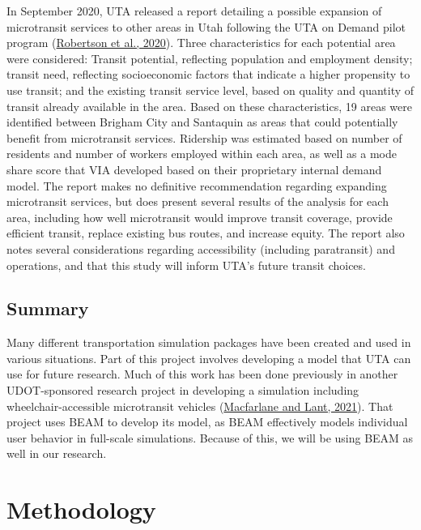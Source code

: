 \documentclass[
]{report}
\begin{document}
In September 2020, UTA released a report detailing a possible expansion of microtransit services to other areas in Utah following the UTA on Demand pilot program (\protect\hyperlink{ref-UTAreport}{Robertson et al., 2020}). Three characteristics for each potential area were considered: Transit potential, reflecting population and employment density; transit need, reflecting socioeconomic factors that indicate a higher propensity to use transit; and the existing transit service level, based on quality and quantity of transit already available in the area. Based on these characteristics, 19 areas were identified between Brigham City and Santaquin as areas that could potentially benefit from microtransit services. Ridership was estimated based on number of residents and number of workers employed within each area, as well as a mode share score that VIA developed based on their proprietary internal demand model. The report makes no definitive recommendation regarding expanding microtransit services, but does present several results of the analysis for each area, including how well microtransit would improve transit coverage, provide efficient transit, replace existing bus routes, and increase equity. The report also notes several considerations regarding accessibility (including paratransit) and operations, and that this study will inform UTA's future transit choices.

\hypertarget{summary}{%
\section{Summary}\label{summary}}

Many different transportation simulation packages have been created and used in various situations. Part of this project involves developing a model that UTA can use for future research. Much of this work has been done previously in another UDOT-sponsored research project in developing a simulation including wheelchair-accessible microtransit vehicles (\protect\hyperlink{ref-MacfarlaneLant}{Macfarlane and Lant, 2021}). That project uses BEAM to develop its model, as BEAM effectively models individual user behavior in full-scale simulations. Because of this, we will be using BEAM as well in our research.

\hypertarget{methodology}{%
\chapter{Methodology}\label{methodology}}
\end{document}
